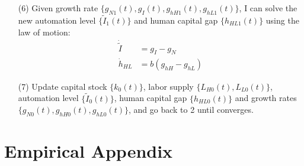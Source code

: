 \documentclass[12pt]{article}
\begin{document}
\begin{appendices}
\begin{itemize}
\item[(6)] Given growth rate $\{g_{N1}(t),g_I(t),g_{hH1}(t),g_{hL1}(t)\}$, I can solve the new automation level $\{\tilde{I}_1(t)\}$ and human capital gap $\{h_{HL1}(t)\}$ using the law of motion: 
\begin{align*}
\dot{\tilde{I}} &= g_I- g_N \\
\dot{h}_{HL} &= b (g_{hH}-g_{hL})
\end{align*}

\item[(7)] Update capital stock $\{k_0(t)\}$, labor supply $\{L_{H0}(t), L_{L0}(t)\}$, automation level $\{\tilde{I}_0(t)\}$, human capital gap $\{h_{HL0}(t)\}$ and growth rates $\{g_{N0}(t),g_{hH0}(t),g_{hL0}(t)\}$, and go back to 2 until converges. 

\end{itemize}

\section{Empirical Appendix}

\end{appendices}
\end{document}

